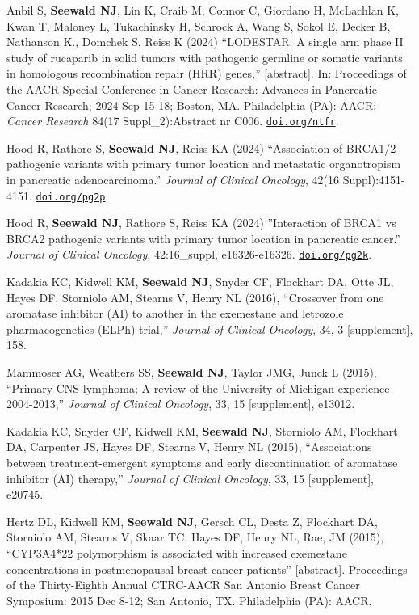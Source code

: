 \documentclass[letterpaper,11pt]{article} %
\begin{document}
\begin{etaremune}
            \item Anbil S, \textbf{Seewald NJ}, Lin K, Craib M, Connor C, Giordano H, McLachlan K, Kwan T, Maloney L, Tukachinsky H, Schrock A, Wang S, Sokol E, Decker B, Nathanson K., Domchek S, Reiss K (2024) ``LODESTAR: A single arm phase II study of rucaparib in solid tumors with pathogenic germline or somatic variants in homologous recombination repair (HRR) genes,'' [abstract]. In: Proceedings of the AACR Special Conference in Cancer Research: Advances in Pancreatic Cancer Research; 2024 Sep 15-18; Boston, MA. Philadelphia (PA): AACR; \textit{Cancer Research} 84(17 Suppl\_2):Abstract nr C006. \href{https://doi.org/ntfr}{\texttt{doi.org/ntfr}}.

            \item Hood R, Rathore S, \textbf{Seewald NJ}, Reiss KA (2024) ``Association of BRCA1/2 pathogenic variants with primary tumor location and metastatic organotropism in pancreatic adenocarcinoma.'' \textit{Journal of Clinical Oncology}, 42(16 Suppl):4151-4151. \href{https://doi.org/pg2p}{\texttt{doi.org/pg2p}}.

            \item Hood R, \textbf{Seewald NJ}, Rathore S, Reiss KA (2024) ''Interaction of BRCA1 vs BRCA2 pathogenic variants with primary tumor location in pancreatic cancer.'' \textit{Journal of Clinical Oncology}, 42:16\_suppl, e16326-e16326. \href{https://doi.org/pg2k}{\texttt{doi.org/pg2k}}.
        
            \item Kadakia KC, Kidwell KM, \textbf{Seewald NJ}, Snyder CF, Flockhart DA, Otte JL, Hayes DF, Storniolo AM, Stearns V, Henry NL (2016), ``Crossover from one aromatase inhibitor (AI) to another in the exemestane and letrozole pharmacogenetics (ELPh) trial,'' \textit{Journal of Clinical Oncology}, 34, 3 [supplement], 158.
    			
            \item Mammoser AG, Weathers SS, \textbf{Seewald NJ}, Taylor JMG, Junck L (2015), ``Primary CNS lymphoma; A review of the University of Michigan experience 2004-2013,'' \textit{Journal of Clinical Oncology}, 33, 15 [supplement], e13012.
    			
            \item Kadakia KC, Snyder CF, Kidwell KM, \textbf{Seewald NJ}, Storniolo AM, Flockhart DA, Carpenter JS, Hayes DF, Stearns V, Henry NL (2015), ``Associations between treatment-emergent symptoms and early discontinuation of aromatase inhibitor (AI) therapy,'' \textit{Journal of Clinical Oncology}, 33, 15 [supplement], e20745.
     		
            \item Hertz DL, Kidwell KM, \textbf{Seewald NJ}, Gersch CL, Desta Z, Flockhart DA, Storniolo AM, Stearns V, Skaar TC, Hayes DF, Henry NL, Rae, JM (2015), ``CYP3A4*22 polymorphism is associated with increased exemestane concentrations in postmenopausal breast cancer patients'' [abstract]. Proceedings of the Thirty-Eighth Annual CTRC-AACR San Antonio Breast Cancer Symposium: 2015 Dec 8-12; San Antonio, TX. Philadelphia (PA): AACR.
 	\end{etaremune}
\end{document}
